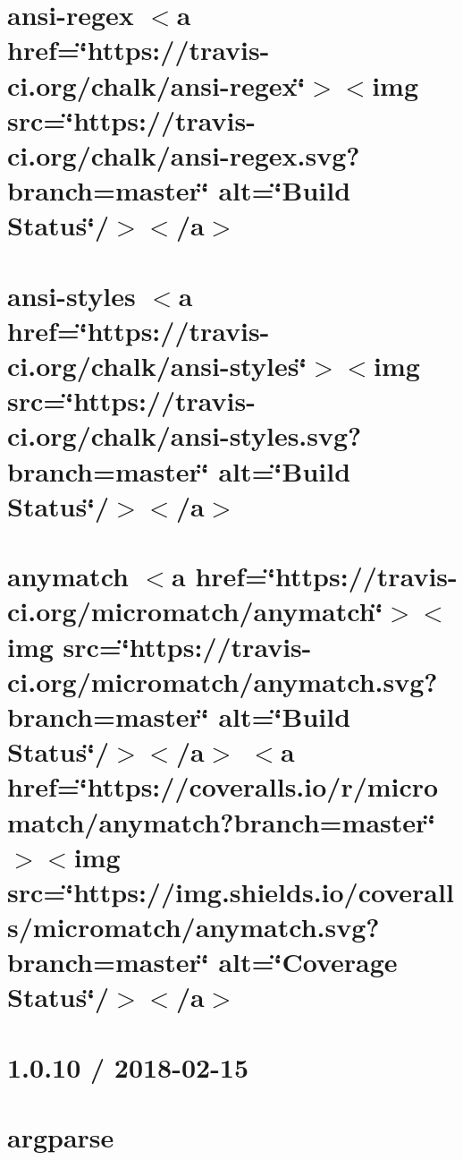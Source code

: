 \let\mypdfximage\pdfximage\def\pdfximage{\immediate\mypdfximage}\documentclass[twoside]{book}
\newcommand{\+}{\discretionary{\mbox{\scriptsize$\hookleftarrow$}}{}{}}
\begin{document}
\chapter{ansi-\/regex $<$a href=\char`\"{}https\+://travis-\/ci.\+org/chalk/ansi-\/regex\char`\"{}$>$$<$img src=\char`\"{}https\+://travis-\/ci.\+org/chalk/ansi-\/regex.\+svg?branch=master\char`\"{} alt=\char`\"{}\+Build Status\char`\"{}/$>$$<$/a$>$}
\label{md_heap-visualizer_node_modules_ansi-regex_readme}

\chapter{ansi-\/styles $<$a href=\char`\"{}https\+://travis-\/ci.\+org/chalk/ansi-\/styles\char`\"{}$>$$<$img src=\char`\"{}https\+://travis-\/ci.\+org/chalk/ansi-\/styles.\+svg?branch=master\char`\"{} alt=\char`\"{}\+Build Status\char`\"{}/$>$$<$/a$>$}
\label{md_heap-visualizer_node_modules_ansi-styles_readme}

\chapter{anymatch $<$a href=\char`\"{}https\+://travis-\/ci.\+org/micromatch/anymatch\char`\"{}$>$$<$img src=\char`\"{}https\+://travis-\/ci.\+org/micromatch/anymatch.\+svg?branch=master\char`\"{} alt=\char`\"{}\+Build Status\char`\"{}/$>$$<$/a$>$ $<$a href=\char`\"{}https\+://coveralls.\+io/r/micromatch/anymatch?branch=master\char`\"{}$>$$<$img src=\char`\"{}https\+://img.\+shields.\+io/coveralls/micromatch/anymatch.\+svg?branch=master\char`\"{} alt=\char`\"{}\+Coverage Status\char`\"{}/$>$$<$/a$>$}
\label{md_heap-visualizer_node_modules_anymatch__r_e_a_d_m_e}

\chapter{1.0.10 / 2018-\/02-\/15}
\label{md_heap-visualizer_node_modules_argparse__c_h_a_n_g_e_l_o_g}

\chapter{argparse}
\label{md_heap-visualizer_node_modules_argparse__r_e_a_d_m_e}

\end{document}
